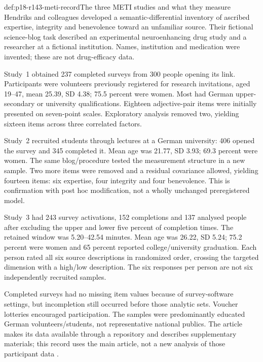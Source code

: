 \begin{hbdefinition}{def:p18-r143-meti-record}{The three METI studies and what they measure}
Hendriks and colleagues developed a semantic-differential inventory of
ascribed expertise, integrity and benevolence toward an unfamiliar source.
Their fictional science-blog task described an experimental neuroenhancing
drug study and a researcher at a fictional institution. Names, institution
and medication were invented; these are not drug-efficacy data.

Study~1 obtained 237 completed surveys from 300 people opening its link.
Participants were volunteers previously registered for research invitations,
aged 19--47, mean 25.39, SD 4.38; 75.5 percent were women. Most had German
upper-secondary or university qualifications. Eighteen adjective-pair
items were initially presented on seven-point scales. Exploratory analysis
removed two, yielding sixteen items across three correlated factors.

Study~2 recruited students through lectures at a German university: 406
opened the survey and 345 completed it. Mean age was 21.77, SD 3.93;
69.3 percent were women. The same blog/procedure tested the measurement
structure in a new sample. Two more items were removed and a residual
covariance allowed, yielding fourteen items: six expertise, four integrity
and four benevolence. This is confirmation with post hoc modification,
not a wholly unchanged preregistered model.

Study~3 had 243 survey activations, 152 completions and 137 analysed people
after excluding the upper and lower five percent of completion times.
The retained window was 5.20--42.54 minutes. Mean age was 26.22, SD 5.24;
75.2 percent were women and 65 percent reported college/university
graduation. Each person rated all six source descriptions in randomized
order, crossing the targeted dimension with a high/low description.
The six responses per person are not six independently recruited samples.
\end{hbdefinition}

Completed surveys had no missing item values because of survey-software
settings, but incompletion still occurred before those analytic sets.
Voucher lotteries encouraged participation. The samples were predominantly
educated German volunteers/students, not representative national publics.
The article makes its data available through a repository and describes
supplementary materials; this record uses the main article, not a new
analysis of those participant data \cite[pp.~4--11]{HendriksKienhuesBromme2015METI}.

